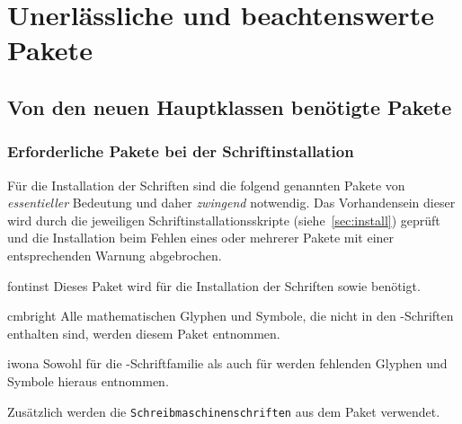 \chapter{Unerlässliche und beachtenswerte Pakete}
\label{sec:packages}
\section{Von den neuen Hauptklassen benötigte Pakete}
\label{sec:packages:needed}
\subsection{Erforderliche Pakete bei der Schriftinstallation}
%
Für die Installation der Schriften sind die folgend genannten Pakete von
\emph{essentieller} Bedeutung und daher \emph{zwingend} notwendig. Das 
Vorhandensein dieser wird durch die jeweiligen Schriftinstallationsskripte
(siehe~\autoref{sec:install}) geprüft und die Installation beim Fehlen eines 
oder mehrerer Pakete mit einer entsprechenden Warnung abgebrochen.
%
\begin{packages}
\item[fontinst]
  Dieses Paket wird für die Installation der Schriften \Univers sowie \DIN 
  benötigt.
\item[cmbright]
  Alle mathematischen Glyphen und Symbole, die nicht in den \Univers-Schriften 
  enthalten sind, werden diesem Paket entnommen.
\item[iwona]
  Sowohl für die \Univers-Schriftfamilie als auch für \DIN werden fehlenden 
  Glyphen und Symbole hieraus entnommen.
\end{packages}
%
Zusätzlich werden die \texttt{Schreibmaschinenschriften} aus dem Paket 
 verwendet.

